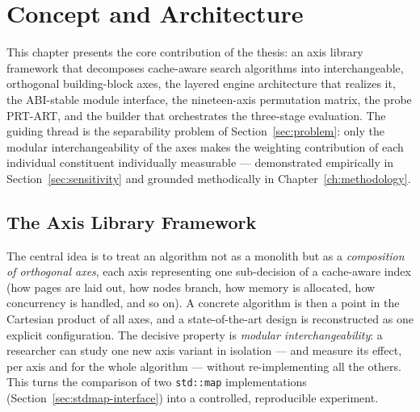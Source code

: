\chapter{Concept and Architecture}\label{ch:concept}

This chapter presents the core contribution of the thesis: an axis library framework that decomposes
cache-aware search algorithms into interchangeable, orthogonal building-block axes, the layered
engine architecture that realizes it, the ABI-stable module interface, the nineteen-axis permutation
matrix, the probe PRT-ART, and the builder that orchestrates the three-stage evaluation. The guiding
thread is the separability problem of Section~\ref{sec:problem}: only the modular interchangeability
of the axes makes the weighting contribution of each individual constituent individually measurable
--- demonstrated empirically in Section~\ref{sec:sensitivity} and grounded methodically in
Chapter~\ref{ch:methodology}.

\section{The Axis Library Framework}\label{sec:axis-framework}

The central idea is to treat an algorithm not as a monolith but as a
\emph{composition of orthogonal axes}, each axis representing one sub-decision of a cache-aware
index (how pages are laid out, how nodes branch, how memory is allocated, how concurrency is
handled, and so on). A concrete algorithm is then a point in the Cartesian product of all axes, and
a state-of-the-art design is reconstructed as one explicit configuration. The decisive property is
\emph{modular interchangeability}: a researcher can study one new axis variant in isolation --- and
measure its effect, per axis and for the whole algorithm --- without re-implementing all the others.
This turns the comparison of two \texttt{std::map} implementations
(Section~\ref{sec:stdmap-interface}) into a controlled, reproducible experiment.

